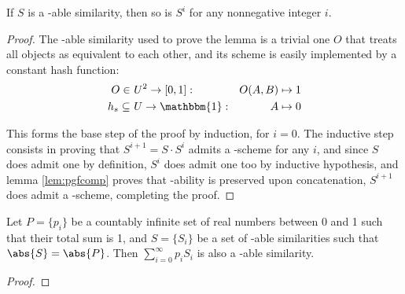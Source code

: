 \begin{lemma}\label{l:powersim}
    If $S$ is a \lsh-able similarity, then so is $S^i$ for any nonnegative integer $i$.
\end{lemma}

\begin{proof}
    The \lsh-able similarity used to prove the lemma is a trivial one $O$ that treats all objects as equivalent to each other, and its scheme is easily implemented by a constant hash function:
    \begin{align*}
        O         \in&\ U^2 \to [0, 1]    : & O(A, B) \mapsto 1 \\
        h_s \subseteq&\ U \to \mathbbm{1} : & A \mapsto 0
    \end{align*}

    This forms the base step of the proof by induction, for $i = 0$. The inductive step consists in proving that $S^{i + 1} = S \cdot S^i$ admits a \lsh-scheme for any $i$, and since $S$ does admit one by definition, $S^i$ does admit one too by inductive hypothesis, and lemma \ref{lem:pgfcomp} proves that \lsh-ability is preserved upon concatenation, $S^{i + 1}$ does admit a \lsh-scheme, completing the proof.
\end{proof}

\begin{lem}[L4]\label{l:pgf_4}
    Let $P = \{p_i\}$ be a countably infinite set of real numbers between 0 and 1 such that their total sum is 1, and $S = \{S_i\}$ be a set of \lsh-able similarities such that $\abs{S} = \abs{P}$. Then $\sum_{i = 0}^{\infty} p_i S_i$ is also a \lsh-able similarity.
\end{lem}

\begin{proof}

\end{proof}

